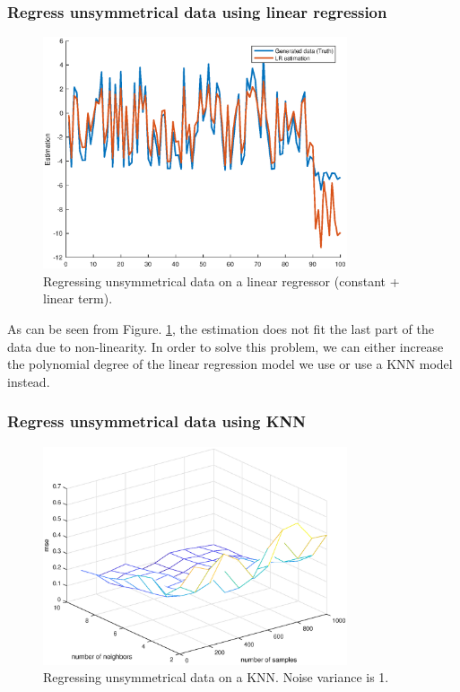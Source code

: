\documentclass[]{article}
\begin{document}
\subsubsection{Regress unsymmetrical data using linear regression}
\begin{figure}[H]
	\caption{Regressing unsymmetrical data on a linear regressor (constant + linear term).}
	\label{fig:unsymmetrical}
	\centering
	\includegraphics[width=0.8\textwidth]{project32c}
\end{figure}

As can be seen from Figure. \ref{fig:unsymmetrical}, the estimation does not fit the last part of the data due to non-linearity. In order to solve this problem, we can either increase the polynomial degree of the linear regression model we use or use a KNN model instead.

\subsubsection{Regress unsymmetrical data using KNN}
\begin{figure}[H]
	\caption{Regressing unsymmetrical data on a KNN. Noise variance is 1.}
	\label{fig:unsymmetricalKNN1}
	\centering
	\includegraphics[width=0.8\textwidth]{project32d1}
\end{figure}
\end{document}
